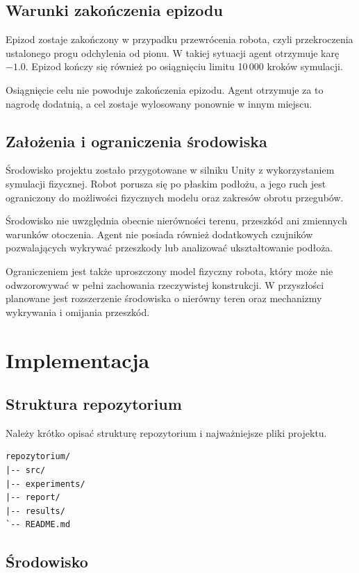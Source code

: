 \documentclass[12pt]{article}
\begin{document}
\subsection{Warunki zakończenia epizodu}

Epizod zostaje zakończony w przypadku przewrócenia robota,
czyli przekroczenia ustalonego progu odchylenia od pionu.
W takiej sytuacji agent otrzymuje karę $-1.0$.
Epizod kończy się również po osiągnięciu limitu
10\,000 kroków symulacji.

Osiągnięcie celu nie powoduje zakończenia epizodu.
Agent otrzymuje za to nagrodę dodatnią, a cel zostaje
wylosowany ponownie w innym miejscu.

\subsection{Założenia i ograniczenia środowiska}

Środowisko projektu zostało przygotowane w silniku Unity
z wykorzystaniem symulacji fizycznej. Robot porusza się
po płaskim podłożu, a jego ruch jest ograniczony do
możliwości fizycznych modelu oraz zakresów obrotu przegubów.

Środowisko nie uwzględnia obecnie nierówności terenu,
przeszkód ani zmiennych warunków otoczenia. Agent nie posiada
również dodatkowych czujników pozwalających wykrywać
przeszkody lub analizować ukształtowanie podłoża.

Ograniczeniem jest także uproszczony model fizyczny robota,
który może nie odwzorowywać w pełni zachowania rzeczywistej
konstrukcji. W przyszłości planowane jest rozszerzenie
środowiska o nierówny teren oraz mechanizmy wykrywania
i omijania przeszkód.

\section{Implementacja}

\subsection{Struktura repozytorium}

Należy krótko opisać strukturę repozytorium i najważniejsze pliki projektu.

\begin{verbatim}
repozytorium/
|-- src/
|-- experiments/
|-- report/
|-- results/
`-- README.md
\end{verbatim}

\subsection{Środowisko}
\end{document}
